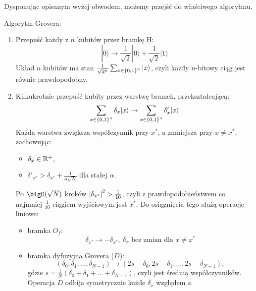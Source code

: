 Dysponując opisanym wyżej obwodem, możemy przejść do właściwego algorytmu.
\begin{greyframe}
	Algorytm Grovera:
	\begin{enumerate}
		\item Przepuść każdy z \( n \) kubitów przez bramkę H:
		      \[
			      |0\rangle \rightarrow \frac{1}{\sqrt{2}}|0\rangle + \frac{1}{\sqrt{2}}|1\rangle
		      \]
		      Układ \( n \) kubitów ma stan \( \frac{1}{\sqrt{2^n}} \sum_{x \in \set{0,1}^n} |x\rangle \), czyli każdy \( n \)-bitowy ciąg jest równie prawdopodobny.
		\item Kilkukrotnie przepuść kubity przez warstwę bramek, przekształcającą:
		      \[
			      \sum_{x \in \set{0,1}^n} \delta_x |x\rangle \rightarrow \sum_{x \in \set{0,1}^n} \delta'_x |x\rangle
		      \]
		      Każda warstwa zwiększa współczynnik przy \( x^{*} \), a zmniejsza przy \( x \neq x^{*} \), zachowując:
		      \begin{itemize}
			      \item \( \delta_x \in \mathbb{R}^{+} \),
			      \item \( \delta'_{x^{*}} > \delta_{x^{*}} + \frac{1}{\alpha\sqrt{N}} \) dla stałej \( \alpha \).
		      \end{itemize}
		      Po \( \bigO(\sqrt{N}) \) kroków \( \left\lvert\delta_{x^{*}}\right\rvert^2 > \frac{1}{10} \), czyli z prawdopodobieństwem co najmniej \( \frac{1}{10} \) ciągiem wyjściowym jest \( x^{*} \).
		      Do osiągnięcia tego służą operacje liniowe:
		      \begin{itemize}
			      \item bramka \( O_f \):
			            \[
				            \delta_{x^{*}} \rightarrow -\delta_{x^{*}}, \ \delta_{x} \text{ bez zmian dla } x \neq x^{*}
			            \]
			      \item bramka dyfuzyjna Grovera (\( D \)):
			            \[
				            (\delta_0, \delta_1, \ldots, \delta_{N-1}) \rightarrow (2s - \delta_0, 2s - \delta_1, \ldots, 2s - \delta_{N-1}),
			            \]
			            gdzie \( s = \frac{1}{N}(\delta_0 + \delta_1 + \ldots + \delta_{N-1}) \), czyli jest średnią współczynników.
			            Operacja \( D \) odbija symetrycznie każde \( \delta_x \) względem \( s \).
		      \end{itemize}
	\end{enumerate}
\end{greyframe}


